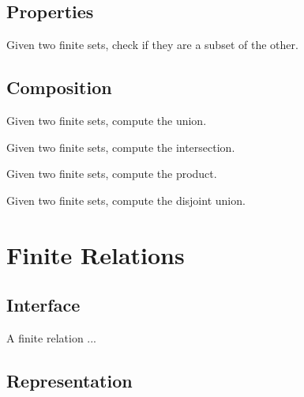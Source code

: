 \subsection{Properties}

\begin{exercise}
  Given two finite sets, check if they are a subset of the other.
\end{exercise}

\subsection{Composition}

\begin{exercise}
  Given two finite sets, compute the union.


\end{exercise}

\begin{exercise}
  Given two finite sets, compute the intersection.


\end{exercise}



\begin{exercise}
  Given two finite sets, compute the product.


\end{exercise}
\begin{exercise}
  Given two finite sets, compute the disjoint union.


\end{exercise}


\section{Finite Relations}

\subsection*{Interface}

A finite relation  ...


\subsection*{Representation}

